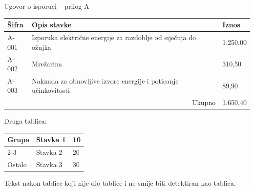 \documentclass[a4paper]{article}
\begin{document}
Ugovor o isporuci -- prilog A

\vspace{1em}
\begin{tabular}{|p{2.5cm}|p{5cm}|p{2cm}|}
\hline
Šifra & Opis stavke & Iznos \\
\hline
A-001 & Isporuka električne energije za razdoblje od siječnja do ožujka & 1.250,00 \\
\hline
A-002 & Mrežarina & 310,50 \\
\hline
A-003 & Naknada za obnovljive izvore energije i poticanje učinkovitosti & 89,90 \\
\hline
\multicolumn{2}{|r|}{Ukupno} & 1.650,40 \\
\hline
\end{tabular}

\vspace{2em}
Druga tablica:

\vspace{1em}
\begin{tabular}{|l|l|l|}
\hline
\multirow{2}{*}{Grupa} & Stavka 1 & 10 \\
\cline{2-3}
 & Stavka 2 & 20 \\
\hline
Ostalo & Stavka 3 & 30 \\
\hline
\end{tabular}

\vspace{2em}
Tekst nakon tablice koji nije dio tablice i ne smije biti detektiran kao tablica.
\end{document}
